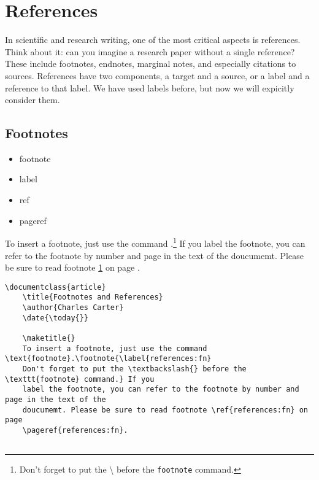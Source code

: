     
    \section{References}
    \label{References}

    In scientific and research writing, one of the most critical aspects is references. Think about it: can you imagine a research paper without a single reference? These include footnotes, endnotes, marginal notes, and especially citations to sources. References have two components, a target and a source, or a label and a reference to that label. We have used labels before, but now we will expicitly consider them.

    \subsection{Footnotes}
    \label{Footnotes}

        \begin{framed}
            \begin{itemize}
                \item{footnote}
                \item{label}
                \item{ref}
                \item{pageref}
            \end{itemize}
        \end{framed}

    To insert a footnote, just use the command .\footnote{\label{references:fn}Don't forget to put the \textbackslash{} before the \texttt{footnote} command.} If you label the footnote, you can refer to the footnote by number and page in the text of the doucumemt. Please be sure to read footnote \ref{references:fn} on page \pageref{references:fn}.

        \begin{verbatim}
\documentclass{article}
    \title{Footnotes and References}
    \author{Charles Carter}
    \date{\today{}}
 
    \maketitle{}
    To insert a footnote, just use the command \text{footnote}.\footnote{\label{references:fn}
    Don't forget to put the \textbackslash{} before the \texttt{footnote} command.} If you 
    label the footnote, you can refer to the footnote by number and page in the text of the
    doucumemt. Please be sure to read footnote \ref{references:fn} on page 
    \pageref{references:fn}.
    
        \end{verbatim}


